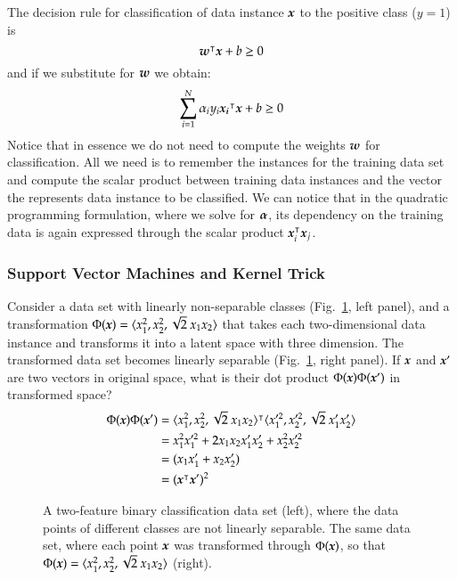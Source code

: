 \begin{refsection}
The decision rule for classification of data instance $\boldsymbol{x}$ to the positive class ($y=1$) is
$$ \boldsymbol{w}^\intercal\boldsymbol{x}+b\geq0 $$
and if we substitute for $\boldsymbol{w}$ we obtain:
$$ \sum_{i=1}^N \alpha_i y_i\boldsymbol{x_i}^\intercal \boldsymbol{x} + b \geq 0 $$
Notice that in essence we do not need to compute the weights $\boldsymbol{w}$ for classification. All we need is to remember the instances for the training data set and compute the scalar product between training data instances and the vector the represents data instance to be classified. We can notice that in the quadratic programming formulation, where we solve for $\boldsymbol{\alpha}$, its dependency on the training data is again expressed through the scalar product $\boldsymbol{x}_i^\intercal\boldsymbol{x}_j$.

\subsubsection*{Support Vector Machines and Kernel Trick}

Consider a data set with linearly non-separable classes (Fig.~\ref{fig:svm-circle}, left panel), and a transformation $\Phi(\boldsymbol{x})=\langle x_1^2, x_2^2, \sqrt{2}\ x_1 x_2\rangle$ that takes each two-dimensional data instance and transforms it into a latent space with three dimension. The transformed data set becomes linearly separable (Fig.~\ref{fig:svm-circle}, right panel). If $\boldsymbol{x}$ and $\boldsymbol{x}'$ are two vectors in original space, what is their dot product $\Phi(\boldsymbol{x})\Phi(\boldsymbol{x}')$ in transformed space?
\begin{align*}
\Phi(\vect{x})\Phi(\vect{x}') & = \langle x_1^2, x_2^2, \sqrt{2}\ x_1 x_2\rangle^\tr \langle x_1'^2, x_2'^2, \sqrt{2}\ x_1' x_2'\rangle \\
& = x_1^2 x_1'^2 + 2 x_1 x_2 x_1' x_2' + x_2^2 x_2'^2 \\
& = (x_1 x_1' + x_2 x_2') \\
& = (\vect{x}^\tr \vect{x}')^2
\end{align*}

\begin{figure}[htbp]
\caption{A two-feature binary classification data set (left), where the data points of different classes are not linearly separable. The same data set, where each point $\boldsymbol{x}$ was transformed through $\Phi(\boldsymbol{x})$, so that $\Phi(\boldsymbol{x})=\langle x_1^2, x_2^2, \sqrt{2}\ x_1 x_2\rangle$ (right).}
\label{fig:svm-circle}
\end{figure}


\end{refsection}
